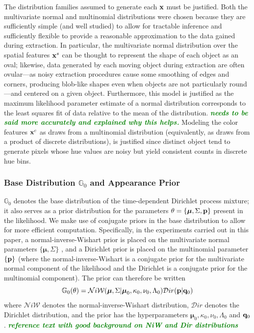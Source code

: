 \documentclass[smallcondensed, final]{svjour3}
\newcommand{\willie}[1]{\textcolor{green}{\textsf{\emph{\textbf{\textcolor{green}{#1}}}}}}
\begin{document}
The distribution families assumed to generate each $\bold{x}$ must be justified. Both the multivariate normal and multinomial distributions were chosen because they are sufficiently simple (and well studied) to allow for tractable inference and sufficiently flexible to provide a reasonable approximation to the data gained during extraction. In particular, the multivariate normal distribution over the spatial features $\bold{x}^{s}$ can be thought to represent the shape of each object as an oval; likewise, data generated by each moving object during extraction are often ovular---as noisy extraction procedures cause some smoothing of edges and corners, producing blob-like shapes even when objects are not particularly round---and centered on a given object. Furthermore, this model is justified as the maximum likelihood parameter estimate of a normal distribution corresponds to the least squares fit of data relative to the mean of the distribution. \willie{needs to be said more accurately and explained why this helps.} Modeling the color features $\bold{x}^{c}$ as draws from a multinomial distribution (equivalently, as draws from a product of discrete distributions), is justified since distinct object tend to generate pixels whose hue values are noisy but yield consistent counts in discrete hue bins.






\subsubsection{Base Distribution $\mathbb{G}_{0}$ and Appearance Prior}

$\mathbb{G}_{0}$ denotes the base distribution of the time-dependent Dirichlet process mixture; it also serves as a prior distribution for the parameters $\theta = \{ \boldsymbol{\mu}, \Sigma, \bold{p} \}$ present in the likelihood. We make use of conjugate priors in the base distribution to allow for more efficient computation. Specifically, in the experiments carried out in this paper, a normal-inverse-Wishart prior is placed on the multivariate normal parameters $\{ \boldsymbol{\mu}, \Sigma \}$ , and a Dirichlet prior is placed on the multinomial parameter $ \{  \bold{p}  \} $ (where the normal-inverse-Wishart is a conjugate prior for the multivariate normal component of the likelihood and the Dirichlet is a conjugate prior for the multinomial component). The prior can therefore be written
\begin{equation}
\label{basedistro}
\mathbb{G}_{0}(\theta) = \mathcal{N}i\mathcal{W}(\boldsymbol{\mu}, \Sigma | \boldsymbol{\mu}_{0}, \kappa_{0}, \nu_{0}, \Lambda_{0})  \mathcal{D}ir( \bold{p} | \bold{q}_{0})
\end{equation}
where $\mathcal{N}i\mathcal{W}$ denotes the normal-inverse-Wishart distribution, $\mathcal{D}ir$ denotes the Dirichlet distribution, and the prior has the hyperparameters $\boldsymbol{\mu}_{0}, \kappa_{0}, \nu_{0}, \Lambda_{0}$ and $\bold{q}_{0}$.  \willie{reference text with good background on NiW and Dir distributions}
\end{document}
